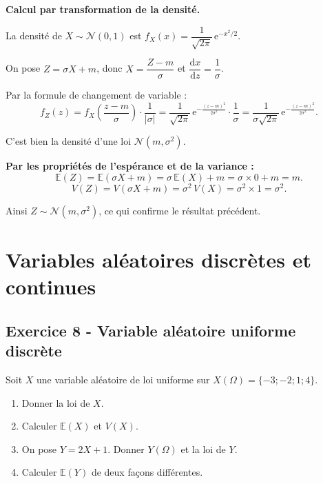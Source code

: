 \documentclass[12pt,a4paper]{article}
\begin{document}
\begin{boitecorrige}
\textbf{Calcul par transformation de la densité.}

La densité de $X \sim \mathcal{N}(0,1)$ est $f_X(x) = \dfrac{1}{\sqrt{2\pi}}\,\mathrm{e}^{-x^2/2}$.

On pose $Z = \sigma X + m$, donc $X = \dfrac{Z-m}{\sigma}$ et $\dfrac{\mathrm{d}x}{\mathrm{d}z} = \dfrac{1}{\sigma}$.

Par la formule de changement de variable :
\[
f_Z(z) = f_X\!\left(\frac{z-m}{\sigma}\right) \cdot \frac{1}{|\sigma|}
= \frac{1}{\sqrt{2\pi}}\,\mathrm{e}^{-\frac{(z-m)^2}{2\sigma^2}} \cdot \frac{1}{\sigma}
= \frac{1}{\sigma\sqrt{2\pi}}\,\mathrm{e}^{-\frac{(z-m)^2}{2\sigma^2}}.
\]

C'est bien la densité d'une loi $\mathcal{N}(m, \sigma^2)$.

\textbf{Par les propriétés de l'espérance et de la variance :}
\[
\mathbb{E}(Z) = \mathbb{E}(\sigma X + m) = \sigma\,\mathbb{E}(X) + m = \sigma \times 0 + m = m.
\]
\[
V(Z) = V(\sigma X + m) = \sigma^2\,V(X) = \sigma^2 \times 1 = \sigma^2.
\]

Ainsi $Z \sim \mathcal{N}(m, \sigma^2)$, ce qui confirme le résultat précédent.
\end{boitecorrige}

\section{Variables aléatoires discrètes et continues}

\subsection*{Exercice 8 - Variable aléatoire uniforme discrète \niveau{\facile}}

\begin{boiteexercice}
Soit $X$ une variable aléatoire de loi uniforme sur $X(\Omega) = \{-3; -2; 1; 4\}$.
\begin{enumerate}
  \item Donner la loi de $X$.
  \item Calculer $\mathbb{E}(X)$ et $V(X)$.
  \item On pose $Y = 2X+1$. Donner $Y(\Omega)$ et la loi de $Y$.
  \item Calculer $\mathbb{E}(Y)$ de deux façons différentes.
\end{enumerate}
\end{boiteexercice}
\end{document}
